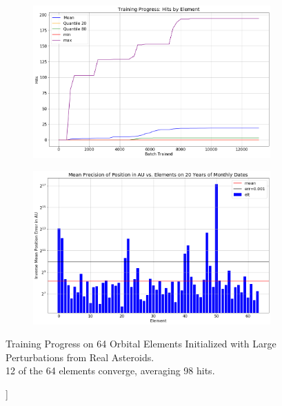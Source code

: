 \begin{figure}[h]
\begin{subfigure}[t]{\subfigwidth\textwidth}
\end{subfigure}
\hfill
\begin{subfigure}[t]{\subfigwidth\textwidth}
\centering
\includegraphics[width=\linewidth]{../figs/search_known/perturbed_large/learning_curve_hits.png}
\end{subfigure}
\medskip
\begin{subfigure}[t]{\textwidth}
\includegraphics[width=1.0\textwidth]{../figs/search_known/perturbed_large/near_ast_dist.png}
\end{subfigure}
\caption[[Training Progress on 64 Orbital Elements Initialized with Large Perturbations]]
{Training Progress on 64 Orbital Elements Initialized with Large Perturbations from Real Asteroids.\\
12 of the 64 elements converge, averaging 98 hits.}
\end{figure}
\clearpage

